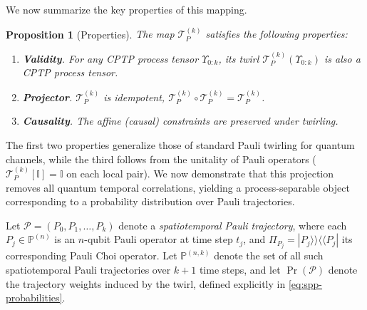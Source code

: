 \documentclass[
    aps,
    prx,
    reprint,
    superscriptaddress,
    longbibliography,
    nofootinbib,
    floatfix,
]{revtex4-2}
\newcommand{\dketbra}[2]{| #1 \rangle \! \rangle \! \langle \! \langle #2 |}
\newtheorem{proposition}[theorem]{Proposition}
\begin{document}
We now summarize the key properties of this mapping.
\begin{proposition}[Properties]
    The map \(\mathcal{T}_P^{(k)}\) satisfies the following properties:
    \begin{enumerate}
        \item \textbf{Validity}. For any CPTP process tensor \(\Upsilon_{0:k}\), its twirl \(\mathcal{T}_P^{(k)}(\Upsilon_{0:k})\) is also a CPTP process tensor.
        \item \textbf{Projector}. \(\mathcal{T}_P^{(k)}\) is idempotent, \(\mathcal{T}_P^{(k)} \circ \mathcal{T}_P^{(k)} = \mathcal{T}_P^{(k)}\).
        \item \textbf{Causality}. The affine (causal) constraints are preserved under twirling.
    \end{enumerate}
\end{proposition}
The first two properties generalize those of standard Pauli twirling for quantum channels, while the third follows from the unitality of Pauli operators (\(\mathcal{T}_P^{(k)}[\mathbb{I}] = \mathbb{I}\) on each local pair). We now demonstrate that this projection removes all quantum temporal correlations, yielding a process-separable object corresponding to a probability distribution over Pauli trajectories.

Let \(\mathcal{P} = (P_0, P_1, \ldots, P_k)\) denote a \emph{spatiotemporal Pauli trajectory}, where each \(P_j \in \mathbb{P}^{(n)}\) is an \(n\)-qubit Pauli operator at time step \(t_j\), and \(\Pi_{P_j} = \dketbra{P_j}{P_j}\) its corresponding Pauli Choi operator. Let \(\mathbb{P}^{(n,k)}\) denote the set of all such spatiotemporal Pauli trajectories over \(k+1\) time steps, and let \(\Pr{(\mathcal{P})}\) denote the trajectory weights induced by the twirl, defined explicitly in \cref{eq:spp-probabilities}.
\end{document}
